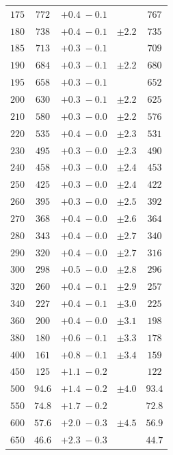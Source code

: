 \begin{table}[h!]
\begin{tabular}{ccccc}
$175 $&$  772  $&$ +0.4 \; -\!0.1 $&$          $&$ 767 $ \\
$180 $&$  738  $&$ +0.4 \; -\!0.1 $&$ \pm 2.2  $&$ 735 $ \\
$185 $&$  713  $&$ +0.3 \; -\!0.1 $&$          $&$ 709 $ \\
$190 $&$  684  $&$ +0.3 \; -\!0.1 $&$ \pm 2.2  $&$ 680 $ \\
$195 $&$  658  $&$ +0.3 \; -\!0.1 $&$          $&$ 652 $ \\
$200 $&$  630  $&$ +0.3 \; -\!0.1 $&$ \pm 2.2  $&$ 625 $ \\
$210 $&$  580  $&$ +0.3 \; -\!0.0 $&$ \pm 2.2  $&$ 576 $ \\
$220 $&$  535  $&$ +0.4 \; -\!0.0 $&$ \pm 2.3  $&$ 531 $ \\
$230 $&$  495  $&$ +0.3 \; -\!0.0 $&$ \pm 2.3  $&$ 490 $ \\
$240 $&$  458  $&$ +0.3 \; -\!0.0 $&$ \pm 2.4  $&$ 453 $ \\
$250 $&$  425  $&$ +0.3 \; -\!0.0 $&$ \pm 2.4  $&$ 422 $ \\
$260 $&$  395  $&$ +0.3 \; -\!0.0 $&$ \pm 2.5  $&$ 392 $ \\
$270 $&$  368  $&$ +0.4 \; -\!0.0 $&$ \pm 2.6  $&$ 364 $ \\
$280 $&$  343  $&$ +0.4 \; -\!0.0 $&$ \pm 2.7  $&$ 340 $ \\
$290 $&$  320  $&$ +0.4 \; -\!0.0 $&$ \pm 2.7  $&$ 316 $ \\
$300 $&$  298  $&$ +0.5 \; -\!0.0 $&$ \pm 2.8  $&$ 296 $ \\
$320 $&$  260  $&$ +0.4 \; -\!0.1 $&$ \pm 2.9  $&$ 257 $ \\
$340 $&$  227  $&$ +0.4 \; -\!0.1 $&$ \pm 3.0  $&$ 225 $ \\
$360 $&$  200  $&$ +0.4 \; -\!0.0 $&$ \pm 3.1  $&$ 198 $ \\
$380 $&$  180  $&$ +0.6 \; -\!0.1 $&$ \pm 3.3  $&$ 178 $ \\
$400 $&$  161  $&$ +0.8 \; -\!0.1 $&$ \pm 3.4  $&$ 159 $ \\
$450 $&$  125  $&$ +1.1 \; -\!0.2 $&$          $&$ 122 $ \\
$500 $&$  94.6 $&$ +1.4 \; -\!0.2 $&$ \pm 4.0  $&$ 93.4 $ \\
$550 $&$  74.8 $&$ +1.7 \; -\!0.2 $&$          $&$ 72.8 $ \\
$600 $&$  57.6 $&$ +2.0 \; -\!0.3 $&$ \pm 4.5  $&$ 56.9 $ \\
$650 $&$  46.6 $&$ +2.3 \; -\!0.3 $&$          $&$ 44.7 $ \\

\end{tabular}
\end{table}
